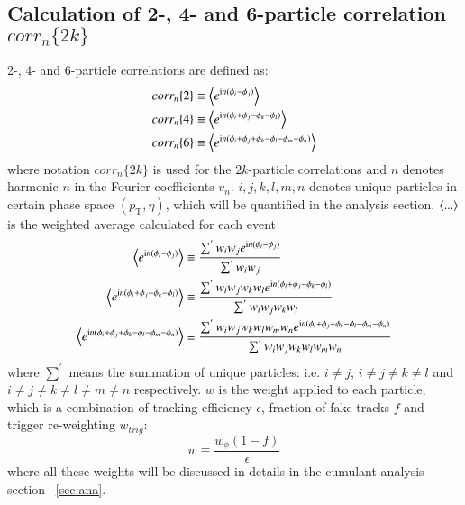 \subsection{Calculation of 2-, 4- and 6-particle correlation $corr_n\{2k\}$}
2-, 4- and 6-particle correlations are defined as:
\begin{equation}
\begin{split}
corr_n\{2\}&\equiv \left\langle e^{\text{i}n(\phi_i-\phi_j)}\right\rangle \\
corr_n\{4\}&\equiv \left\langle e^{\text{i}n(\phi_i+\phi_j-\phi_k-\phi_l)}\right\rangle \\
corr_n\{6\}&\equiv \left\langle e^{\text{i}n(\phi_i+\phi_j+\phi_k-\phi_l-\phi_m-\phi_n)}\right\rangle
\end{split}
\end{equation}
where notation $corr_n\{2k\}$ is used for the $2k$-particle correlations and $n$ denotes harmonic $n$ in the Fourier coefficients $v_n$. $i, j, k, l, m, n$ denotes unique particles in certain phase space $(p_\text{T},\eta)$, which will be quantified in the analysis section. $\left\langle ...\right\rangle$ is the weighted average calculated for each event
\begin{equation}
\begin{split}
\left\langle e^{\text{i}n(\phi_i-\phi_j)}\right\rangle&\equiv \frac{\sum^{'}{w_i w_j e^{\text{i}n(\phi_i-\phi_j)}}}{\sum^{'}{w_i w_j}} \\
\left\langle e^{\text{i}n(\phi_i+\phi_j-\phi_k-\phi_l)}\right\rangle&\equiv \frac{\sum^{'}{w_i w_j w_k w_l e^{\text{i}n(\phi_i+\phi_j-\phi_k-\phi_l)}}}{\sum^{'}{w_i w_j w_k w_l}} \\
\left\langle e^{\text{i}n(\phi_i+\phi_j+\phi_k-\phi_l-\phi_m-\phi_n)}\right\rangle&\equiv \frac{\sum^{'}{w_i w_j w_k w_l w_m w_n e^{\text{i}n(\phi_i+\phi_j+\phi_k-\phi_l-\phi_m-\phi_n)}}}{\sum^{'}{w_i w_j w_k w_l w_m w_n}}
\end{split}
\end{equation}
where $\sum^{'}$ means the summation of unique particles: i.e. $i\neq j$, $i\neq j\neq k\neq l$ and $i\neq j\neq k\neq l\neq m\neq n$ respectively. $w$ is the weight applied to each particle, which is a combination of tracking efficiency $\epsilon$, fraction of fake tracks $f$ and trigger re-weighting $w_{trig}$:
\begin{equation}
w\equiv\frac{w_{\phi}(1-f)}{\epsilon}
\end{equation}
where all these weights will be discussed in details in the cumulant analysis section ~\ref{sec:ana}.

